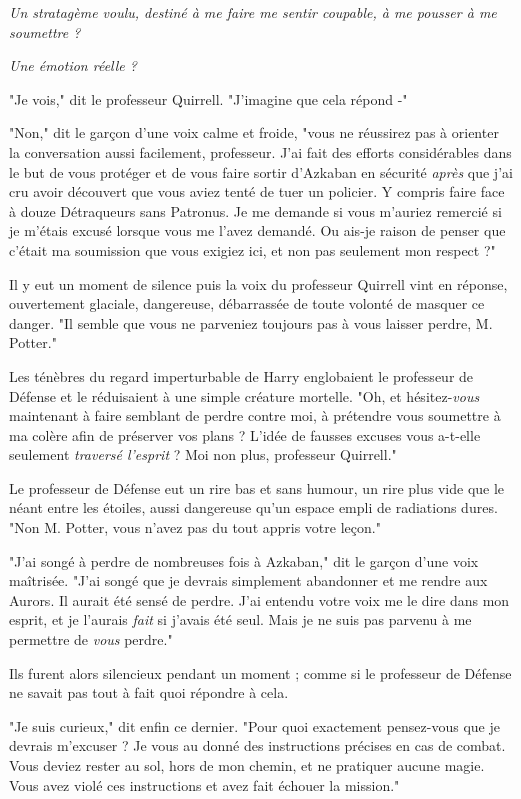 \emph{Un stratagème voulu, destiné à me faire me sentir coupable, à me pousser à me soumettre ?} 

\emph{Une émotion réelle ?} 

"Je vois," dit le professeur Quirrell. "J'imagine que cela répond -"

"Non," dit le garçon d'une voix calme et froide, "vous ne réussirez pas à orienter la conversation aussi facilement, professeur. J'ai fait des efforts considérables dans le but de vous protéger et de vous faire sortir d'Azkaban en sécurité \emph{après}  que j'ai cru avoir découvert que vous aviez tenté de tuer un policier. Y compris faire face à douze Détraqueurs sans Patronus. Je me demande si vous m'auriez remercié si je m'étais excusé lorsque vous me l'avez demandé. Ou ais-je raison de penser que c'était ma soumission que vous exigiez ici, et non pas seulement mon respect ?"

Il y eut un moment de silence puis la voix du professeur Quirrell vint en réponse, ouvertement glaciale, dangereuse, débarrassée de toute volonté de masquer ce danger. "Il semble que vous ne parveniez toujours pas à vous laisser perdre, M. Potter."

Les ténèbres du regard imperturbable de Harry englobaient le professeur de Défense et le réduisaient à une simple créature mortelle. "Oh, et hésitez-\emph{vous}  maintenant à faire semblant de perdre contre moi, à prétendre vous soumettre à ma colère afin de préserver vos plans ? L'idée de fausses excuses vous a-t-elle seulement \emph{traversé l'esprit } ? Moi non plus, professeur Quirrell."

Le professeur de Défense eut un rire bas et sans humour, un rire plus vide que le néant entre les étoiles, aussi dangereuse qu'un espace empli de radiations dures. "Non M. Potter, vous n'avez pas du tout appris votre leçon."

"J'ai songé à perdre de nombreuses fois à Azkaban," dit le garçon d'une voix maîtrisée. "J'ai songé que je devrais simplement abandonner et me rendre aux Aurors. Il aurait été sensé de perdre. J'ai entendu votre voix me le dire dans mon esprit, et je l'aurais \emph{fait}  si j'avais été seul. Mais je ne suis pas parvenu à me permettre de \emph{vous } perdre."

Ils furent alors silencieux pendant un moment ; comme si le professeur de Défense ne savait pas tout à fait quoi répondre à cela.

"Je suis curieux," dit enfin ce dernier. "Pour quoi exactement pensez-vous que je devrais m'excuser ? Je vous au donné des instructions précises en cas de combat. Vous deviez rester au sol, hors de mon chemin, et ne pratiquer aucune magie. Vous avez violé ces instructions et avez fait échouer la mission."

